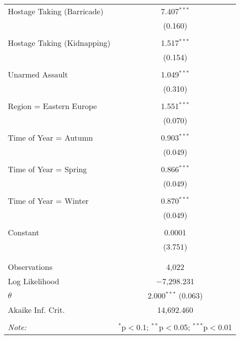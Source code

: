 \begin{table}[!htbp]
\begin{tabular}{@{\extracolsep{5pt}}lc}
 Hostage Taking (Barricade) & 7.407$^{***}$ \\ 
  & (0.160) \\ 
  & \\ 
 Hostage Taking (Kidnapping) & 1.517$^{***}$ \\ 
  & (0.154) \\ 
  & \\ 
 Unarmed Assault & 1.049$^{***}$ \\ 
  & (0.310) \\ 
  & \\ 
 Region = Eastern Europe & 1.551$^{***}$ \\ 
  & (0.070) \\ 
  & \\ 
 Time of Year = Autumn & 0.903$^{***}$ \\ 
  & (0.049) \\ 
  & \\ 
 Time of Year = Spring & 0.866$^{***}$ \\ 
  & (0.049) \\ 
  & \\ 
 Time of Year = Winter & 0.870$^{***}$ \\ 
  & (0.049) \\ 
  & \\ 
 Constant & 0.0001 \\ 
  & (3.751) \\ 
  & \\ 
\hline \\[-1.8ex] 
Observations & 4,022 \\ 
Log Likelihood & $-$7,298.231 \\ 
$\theta$ & 2.000$^{***}$  (0.063) \\ 
Akaike Inf. Crit. & 14,692.460 \\ 
\hline 
\hline \\[-1.8ex] 
\textit{Note:}  & \multicolumn{1}{r}{$^{*}$p$<$0.1; $^{**}$p$<$0.05; $^{***}$p$<$0.01} \\ 
\end{tabular} 
\end{table} 
